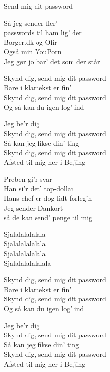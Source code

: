 \begin{song}{Send mig dit password}
\begin{SBVerse}
Så jeg sender fler' \\
passwords til ham lig' der\\
Borger.dk og Ofir \\
Også min YouPorn \\
Jeg gør jo bar' det som der står \\
\end{SBVerse}

\begin{SBChorus}
  Skynd dig, send mig dit password \\
  Bare i klartekst er fin' \\
Skynd dig, send mig dit password \\
Og så kan du igen log' ind \\ \medskip

Jeg be'r dig \\
Skynd dig, send mig dit password \\
Så kan jeg fikse din' ting \\
Skynd dig, send mig dit password \\
Afsted til mig her i Beijing \\
\end{SBChorus}

\begin{SBVerse}
Preben gi'r svar \\
Han si'r det' top-dollar \\
Hans chef er dog lidt forleg'n \\
Jeg sender Dankort \\
så de kan send' penge til mig \\
\end{SBVerse}

\begin{SBSection*}
  Sjalalalalalala \\
  Sjalalalalalala \\
  Sjalalalalalala \\
  Sjalalalalalalala \\
\end{SBSection*}
  
\begin{SBChorus}
Skynd dig, send mig dit password \\
Bare i klartekst er fin' \\
Skynd dig, send mig dit password \\
Og så kan du igen log' ind \\ \medskip

Jeg be'r dig \\
Skynd dig, send mig dit password \\
Så kan jeg fikse din' ting \\
Skynd dig, send mig dit password \\
Afsted til mig her i Beijing \\
\end{SBChorus}

\end{song}